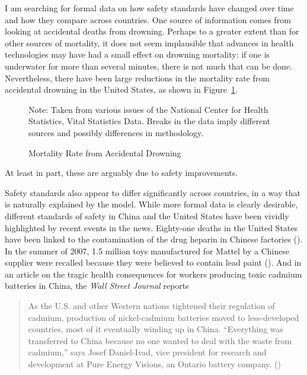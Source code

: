 \documentclass[12pt,twoside]{article}
\newcommand{\cnp}[1]{(\citealt{#1})}  %
\newcommand{\fignote}[2]{\begin{center}\parbox[c]{#1}{\footnotesize #2} \end{center}}
\begin{document}
I am searching for formal data on how safety standards have changed over
time and how they compare across countries. One source of information
comes from looking at accidental deaths from drowning. Perhaps to a
greater extent than for other sources of mortality, it does not seem
implausible that advances in health technologies may have had a small
effect on drowning mortality: if one is underwater for more than several
minutes, there is not much that can be done. Nevertheless, there have
been large reductions in the mortality rate from accidental drowning in
the United States, as shown in Figure~\ref{fig:drown}.
\begin{figure}[tp]
\caption{Mortality Rate from Accidental Drowning}
\label{fig:drown}
\fignote{4.5in}{Note: Taken from various issues of the National Center
  for Health Statistics, Vital Statistics Data.  Breaks in the data
  imply different sources and possibly differences in methodology.}
\end{figure} 
At least in part, these are arguably due to safety improvements.


Safety standards also appear to differ significantly across countries,
in a way that is naturally explained by the model. While more formal
data is clearly desirable, different standards of safety in China and
the United States have been vividly highlighted by recent events in the
news. Eighty-one deaths in the United States have been linked to the
contamination of the drug heparin in Chinese factories
\cnp{MundyWSJ2008}. In the summer of 2007, 1.5 million toys manufactured
for Mattel by a Chinese supplier were recalled because they were
believed to contain lead paint \cnp{SpencerYeWSJ2008}. And in an article
on the tragic health consequences for workers producing toxic cadmium
batteries in China, the {\it Wall Street Journal} reports
\begin{quote}
As the U.S. and other Western nations tightened their regulation of
cadmium, production of nickel-cadmium batteries moved to less-developed
countries, most of it eventually winding up in China. ``Everything was
transferred to China because no one wanted to deal with the waste from
cadmium,'' says Josef Daniel-Ivad, vice president for research and
development at Pure Energy Visions, an Ontario battery company. 
\cnp{CaseyZamiskaWSJ2007}
\end{quote}
\end{document}
